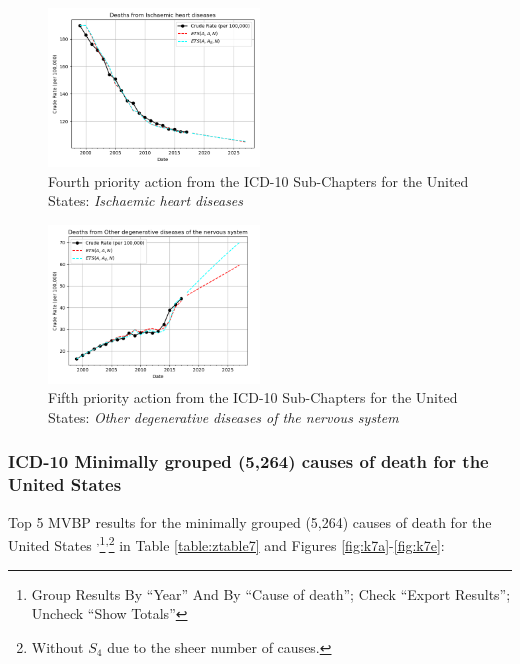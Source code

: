 \documentclass[10pt, a4paper, twocolumn]{IEEEconf}
\newcommand\footnotesstartsep{\textsuperscript{,}}
\newcommand\footnotescontinue{\textsuperscript{,}}
\begin{document}
\begin{figure}[H]
  \centering
  \includegraphics[width=0.5\textwidth]{results/US_ICD10_SUB_CHAPTERS/Ischaemic_heart_diseases_ets.png}
  \caption{Fourth priority action from the ICD-10 Sub-Chapters for the United States: \textit{Ischaemic heart diseases}}\label{fig:k6d}
\end{figure}
  
\begin{figure}[H]
  \centering
  \includegraphics[width=0.5\textwidth]{results/US_ICD10_SUB_CHAPTERS/Other_degenerative_diseases_of_the_nervous_system_ets.png}
  \caption{Fifth priority action from the ICD-10 Sub-Chapters for the United States: \textit{Other degenerative diseases of the nervous system}}\label{fig:k6e}
\end{figure}
  
\clearpage

\subsubsection{ICD-10 Minimally grouped (5,264) causes of death for the United States}

Top 5 MVBP results for the minimally grouped (5,264) causes of death for the United States \citep{centers2017underlying}\footnotesstartsep\footnote{Group Results By \enquote{Year} And By \enquote{Cause of death}; Check \enquote{Export Results}; Uncheck \enquote{Show Totals}}\footnotescontinue\footnote{Without $S_4$ due to the sheer number of causes.} in Table \ref{table:ztable7} and Figures \ref{fig:k7a}-\ref{fig:k7e}:
\end{document}
